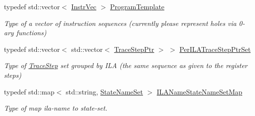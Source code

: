 \begin{DoxyCompactItemize}
typedef std\+::vector$<$ \mbox{\hyperlink{classilang_1_1_memory_model_ac6cb2d9253fb53a10ea66fd1e71267bc}{Instr\+Vec}} $>$ \mbox{\hyperlink{classilang_1_1_memory_model_a72bd17543b5e5cbaefeb994c933622f5}{Program\+Template}}
\begin{DoxyCompactList}\small\item\em Type of a vector of instruction sequences (currently please represent holes via 0-\/ary functions) \end{DoxyCompactList}\item 
\mbox{\label{classilang_1_1_memory_model_a63c54f7a6de8ceaa63ae12038ca6abd0}} 
typedef std\+::vector$<$ std\+::vector$<$ \mbox{\hyperlink{classilang_1_1_memory_model_a0a752e8aa7fc6e84b6b6d4e596782860}{Trace\+Step\+Ptr}} $>$ $>$ \mbox{\hyperlink{classilang_1_1_memory_model_a63c54f7a6de8ceaa63ae12038ca6abd0}{Per\+I\+L\+A\+Trace\+Step\+Ptr\+Set}}
\begin{DoxyCompactList}\small\item\em Type of \mbox{\hyperlink{classilang_1_1_trace_step}{Trace\+Step}} set grouped by I\+LA (the same sequence as given to the register steps) \end{DoxyCompactList}\item 
\mbox{\label{classilang_1_1_memory_model_a9e23cd7d325902a4ab1a4f5d8acea67b}} 
typedef std\+::map$<$ std\+::string, \mbox{\hyperlink{classilang_1_1_memory_model_a0950692c6a72496a2dda46aa985cb337}{State\+Name\+Set}} $>$ \mbox{\hyperlink{classilang_1_1_memory_model_a9e23cd7d325902a4ab1a4f5d8acea67b}{I\+L\+A\+Name\+State\+Name\+Set\+Map}}
\begin{DoxyCompactList}\small\item\em Type of map ila-\/name to state-\/set. \end{DoxyCompactList}\end{DoxyCompactItemize}
